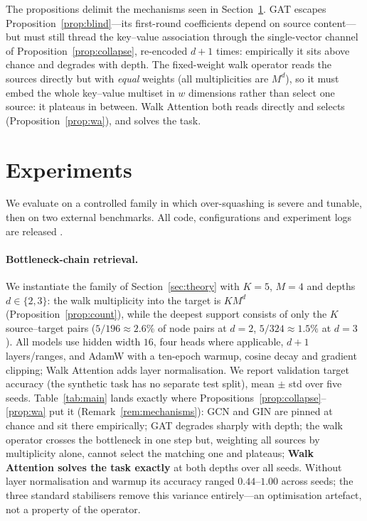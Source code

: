 \documentclass[runningheads]{llncs}
\begin{document}
\begin{remark}\label{rem:mechanisms}
The propositions delimit the mechanisms seen in Section~\ref{sec:exp}. GAT
escapes Proposition~\ref{prop:blind}---its first-round coefficients depend on
source content---but must still thread the key--value association through the
single-vector channel of Proposition~\ref{prop:collapse}, re-encoded $d+1$
times: empirically it sits above chance and degrades with depth. The
fixed-weight walk operator reads the sources directly but with \emph{equal}
weights (all multiplicities are $M^d$), so it must embed the whole key--value
multiset in $w$ dimensions rather than select one source: it plateaus in
between. Walk Attention both reads directly and selects
(Proposition~\ref{prop:wa}), and solves the task.
\end{remark}

\section{Experiments}\label{sec:exp}

We evaluate on a controlled family in which over-squashing is severe and
tunable, then on two external benchmarks. All code, configurations and
experiment logs are released \cite{repo_walkattention}.

\paragraph{Bottleneck-chain retrieval.}
We instantiate the family of Section~\ref{sec:theory} with $K{=}5$, $M{=}4$ and
depths $d\in\{2,3\}$: the walk multiplicity into the target is $KM^d$
(Proposition~\ref{prop:count}), while the deepest support consists of only the
$K$ source--target pairs ($5/196\approx2.6\%$ of node pairs at $d{=}2$,
$5/324\approx1.5\%$ at $d{=}3$). All models use hidden width $16$, four heads
where applicable, $d{+}1$ layers/ranges, and AdamW with a ten-epoch warmup,
cosine decay and gradient clipping; Walk Attention adds layer normalisation. We
report validation target accuracy (the synthetic task has no separate test
split), mean $\pm$ std over five seeds. Table~\ref{tab:main} lands exactly
where Propositions~\ref{prop:collapse}--\ref{prop:wa} put it
(Remark~\ref{rem:mechanisms}): GCN and GIN are pinned at chance and sit there
empirically; GAT degrades sharply with depth; the walk operator crosses the
bottleneck in one step but, weighting all sources by multiplicity alone,
cannot select the matching one and plateaus; \textbf{Walk Attention solves the
task exactly} at both depths over all seeds. Without layer normalisation and
warmup its accuracy ranged $0.44$--$1.00$ across seeds; the three standard
stabilisers remove this variance entirely---an optimisation artefact, not a
property of the operator.
\end{document}
